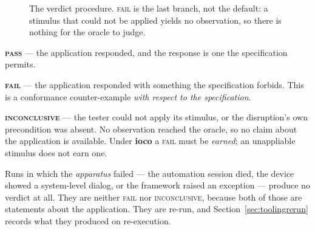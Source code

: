 \documentclass[11pt,a4paper]{article}
\begin{document}
\begin{figure}[h]
\centering
{}
\caption{The verdict procedure. \textsc{fail} is the last branch, not the
default: a stimulus that could not be applied yields no observation, so there is
nothing for the oracle to judge.}
\label{fig:verdict}
\end{figure}

\noindent\textbf{\textsc{pass}} --- the application responded, and the response is
one the specification permits.

\noindent\textbf{\textsc{fail}} --- the application responded with something the
specification forbids. This is a conformance counter-example \emph{with respect
to the specification}.

\noindent\textbf{\textsc{inconclusive}} --- the tester could not apply its
stimulus, or the disruption's own precondition was absent. No observation reached
the oracle, so no claim about the application is available. Under \textbf{ioco} a
\textsc{fail} must be \emph{earned}; an unappliable stimulus does not earn one.

\medskip
Runs in which the \emph{apparatus} failed --- the automation session died, the
device showed a system-level dialog, or the framework raised an exception ---
produce no verdict at all. They are neither \textsc{fail} nor
\textsc{inconclusive}, because both of those are statements about the
application. They are re-run, and Section~\ref{sec:toolingrerun} records what
they produced on re-execution.
\end{document}
